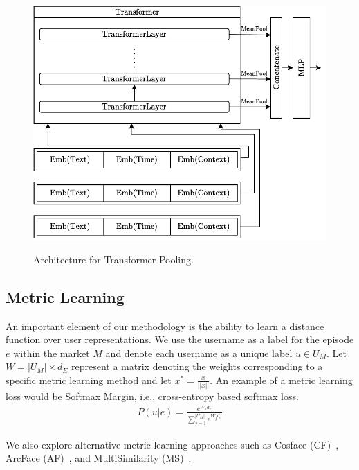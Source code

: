 \begin{figure}
    \centering
    \includegraphics[width=0.7\linewidth,alt={Block diagram of transformer pooling.}]{sysml/figures/EmbeddingTransformer.pdf}
    \caption{Architecture for Transformer Pooling.
    }
    \label{fig:emb_transformer}
\end{figure}

\subsection{Metric Learning}
\label{sec:framework:metric_learning}
An important element of our methodology is the ability to learn a distance function over user representations. We use the username as a label for the episode $e$ within the market $M$ and denote each username as a unique label $u \in U_M$.
Let $W =  |U_M| \times d_E $ represent a matrix denoting the weights corresponding to a specific metric learning method and let $x ^ * = \frac{x}{ || x||}$.
An example of a metric learning loss would be Softmax Margin, i.e., cross-entropy based softmax loss.
\begin{align*}
    P(u | e) = \frac{e^{W_{u} d_e}}{\sum\limits_{j=1}^{|U_M|}{e^{W_j d_e}}}
\end{align*}

We also explore alternative metric learning approaches such as Cosface (CF)~\cite{wang2018cosface}, ArcFace (AF)~\cite{deng2019arcface}, and MultiSimilarity (MS)~\cite{wang2019multi}. 

